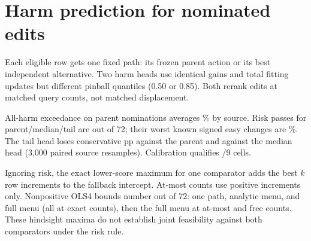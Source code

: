 \section{Harm prediction for nominated edits}
Each eligible row gets one fixed path: its frozen parent action or
its best independent alternative. Two harm heads use identical
gains and \SelectedHarmUpdates{} total fitting updates but different
pinball quantiles (0.50 or 0.85). Both rerank \SelectedHarmEdits{}
edits at matched query counts, not matched displacement.

All-harm exceedance on parent nominations averages
\SelectedHarmExceed{}\% by source. Risk passes for parent/median/tail are
\SelectedHarmPasses{} out of 72; their worst known signed easy
changes are \SelectedHarmWorst{}\%. The tail head loses
\SelectedHarmParent{} conservative pp against the parent and
\SelectedHarmMedian{} against the median head (3,000 paired source
resamples). Calibration qualifies \SelectedHarmQual{}/9 cells.

Ignoring risk, the exact lower-score maximum for one comparator
adds the best $k$ row increments to the fallback intercept.
At-most counts use positive increments only. Nonpositive OLS4
bounds number \SelectedHarmCapacity{} out of 72: one path, analytic
menu, and full menu (all at exact counts), then the full menu at
at-most and free counts. These hindsight maxima do not establish
joint feasibility against both comparators under the risk rule.

